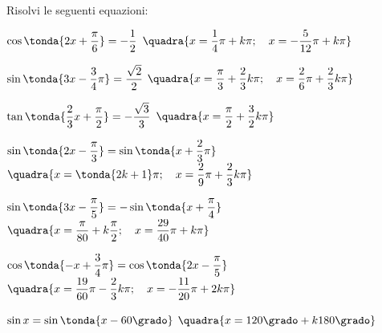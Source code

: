 \begin{esercizio}\label{ese:03.1}
Risolvi le seguenti equazioni:
 \begin{enumeratea}
  \item $\cos \tonda{2x + \dfrac{\pi}{6}} = -\dfrac{1}{2}$
   \hfill $\quadra{x = \dfrac{1}{4}\pi + k \pi; \quad
                   x = -\dfrac{5}{12}\pi + k \pi}$
  \item $\sin \tonda{3 x - \dfrac{3}{4} \pi}= \dfrac{\sqrt{2}}{2}$
   \hfill $\quadra{x = \dfrac{\pi}{3} + \dfrac{2}{3} k \pi; \quad
                   x = \dfrac{2}{6}\pi + \dfrac{2}{3} k \pi}$
  \item $\tan \tonda{\dfrac{2}{3} x + \dfrac{\pi}{2}} = -\dfrac{\sqrt{3}}{3}$
   \hfill $\quadra{x = \dfrac{\pi}{2} + \dfrac{3}{2} k \pi}$
  \item $\sin \tonda{2 x - \dfrac{\pi}{3}} = \sin \tonda{x + \dfrac{2}{3}\pi}$
   \hfill $\quadra{x = \tonda{2k +1} \pi; \quad
                   x = \dfrac{2}{9}\pi + \dfrac{2}{3} k \pi}$
  \item $\sin \tonda{3 x - \dfrac{\pi}{5}} = - \sin \tonda{x + \dfrac{\pi}{4}}$
   \hfill $\quadra{x = \dfrac{\pi}{80} + k \dfrac{\pi}{2}; \quad
                   x = \dfrac{29}{40}\pi + k \pi}$
  \item $\cos \tonda{-x + \dfrac{3}{4}\pi} = \cos \tonda{2 x - \dfrac{\pi}{5}}$
   \hfill $\quadra{x = \dfrac{19}{60}\pi - \dfrac{2}{3} k \pi; \quad
                   x = - \dfrac{11}{20}\pi + 2 k \pi}$
  \item $\sin x = \sin \tonda{x - 60 \grado}$
   \hfill $\quadra{x = 120 \grado + k 180 \grado}$
 \end{enumeratea}
\end{esercizio}

